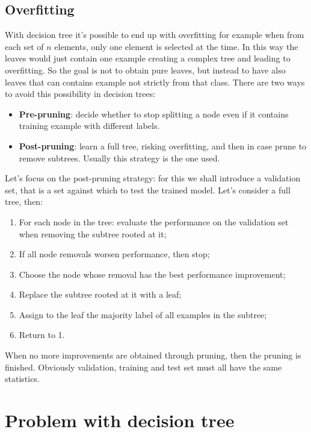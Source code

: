 \subsection{Overfitting}
With decision tree it's possible to end up with overfitting for example when from each set of $n$ elements, only one element is selected at the time. In this way the leaves would just contain one example creating a complex tree and leading to overfitting. \newline
So the goal is not to obtain pure leaves, but instead to have also leaves that can contains example not strictly from that class.\newline
There are two ways to avoid this possibility in decision trees:
\begin{itemize}
	\item \textbf{Pre-pruning}: decide whether to stop splitting a node even if it contains training example with different labels.
	\item \textbf{Post-pruning}: learn a full tree, risking overfitting, and then in case prune to remove subtrees. Usually this strategy is the one used.
\end{itemize}
Let's focus on the post-pruning strategy: for this we shall introduce a validation set, that is a set against which to test the trained model. Let's consider a full tree, then:
\begin{enumerate}
	\item For each node in the tree: evaluate the performance on the validation set when removing the subtree rooted at it;
	\item If all node removals worsen performance, then stop;
	\item Choose the node whose removal has the best performance improvement;
	\item Replace the subtree rooted at it with a leaf;
	\item Assign to the leaf the majority label of all examples in the subtree;
	\item Return to 1.
\end{enumerate}
When no more improvements are obtained through pruning, then the pruning is finished. \newline
Obviously validation, training and test set must all have the same statistics.\newline
%
%
%
\section{Problem with decision tree}
%
%
